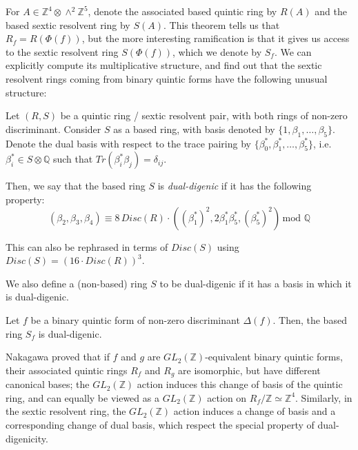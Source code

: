 \documentclass{report}
\begin{document}
For $A \in \mathbb{Z}^4 \otimes \wedge^2 \mathbb{Z}^5$, denote the associated based quintic ring by $R(A)$ and the based sextic resolvent ring by $S(A)$.  This theorem tells us that $R_f = R(\Phi(f))$, but the more interesting ramification is that it gives us access to the sextic resolvent ring $S(\Phi(f))$, which we denote by $S_f$.  We can explicitly compute its multiplicative structure, and find out that the sextic resolvent rings coming from binary quintic forms have the following unusual structure:

\begin{definition} \label{dual digenic}
Let $(R,S)$ be a quintic ring / sextic resolvent pair, with both rings of non-zero discriminant.  Consider $S$ as a based ring, with basis denoted by $\{1,\beta_1,\ldots,\beta_5\}$.  Denote the dual basis with respect to the trace pairing by $\{\beta_0^*,\beta_1^*,\ldots,\beta_5^*\}$, i.e. $\beta_i^* \in S \otimes \mathbb{Q}$ such that $Tr(\beta_i^* \beta_j) = \delta_{ij}$.

Then, we say that the based ring $S$ is \emph{dual-digenic} if it has the following property:
\begin{equation}
(\beta_2,\beta_3,\beta_4) \equiv 8 \, Disc(R) \cdot ( (\beta_1^*)^2, 2 \beta_1^* \beta_5^*, (\beta_5^*)^2 ) \, \text{mod} \, \, \mathbb{Q}
\end{equation}

This can also be rephrased in terms of $Disc(S)$ using $Disc(S) = (16 \cdot Disc(R))^3$.

We also define a (non-based) ring $S$ to be dual-digenic if it has a basis in which it is dual-digenic.
\end{definition}

\begin{theorem} \label{sextic structure}
Let $f$ be a binary quintic form of non-zero discriminant $\Delta(f)$.  Then, the based ring $S_f$ is dual-digenic.
\end{theorem}

Nakagawa proved that if $f$ and $g$ are $GL_2(\mathbb{Z})$-equivalent binary quintic forms, their associated quintic rings $R_f$ and $R_g$ are isomorphic, but have different canonical bases; the $GL_2(\mathbb{Z})$ action induces this change of basis of the quintic ring, and can equally be viewed as a $GL_2(\mathbb{Z})$ action on $R_f / \mathbb{Z} \simeq \mathbb{Z}^4$.  Similarly, in the sextic resolvent ring, the $GL_2(\mathbb{Z})$ action induces a change of basis and a corresponding change of dual basis, which respect the special property of dual-digenicity.
\end{document}
